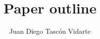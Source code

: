 \documentclass[11pt,oneside,a4paper]{article}
\begin{document}
\title{Paper outline}
\author{Juan Diego Tascón Vidarte}
\maketitle


\end{document}
